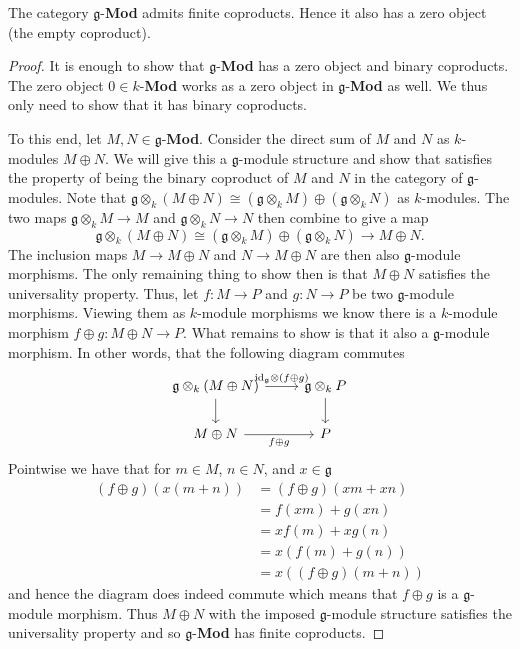 \begin{lemma}
  \label{lem:fincoprod}
  The category $ \mathfrak{g} $-\textbf{Mod} admits finite coproducts. Hence it also has a zero object (the empty coproduct).
\end{lemma}
\begin{proof}
  It is enough to show that $ \mathfrak{g} $-\textbf{Mod} has a zero object and binary coproducts. The zero object $ 0 \in k $-\textbf{Mod} works as a zero object in $ \mathfrak{g} $-\textbf{Mod} as well. We thus only need to show that it has binary coproducts.

  To this end, let $ M,N \in \mathfrak{g} $-\textbf{Mod}. Consider the direct sum of $ M $ and $ N $ as $ k $-modules $ M \oplus N $. We will give this a $ \mathfrak{g} $-module structure and show that satisfies the property of being the binary coproduct of $ M $ and $ N $ in the category of $ \mathfrak{g} $-modules. Note that $ \mathfrak{g} \otimes_k (M \oplus N) \cong (\mathfrak{g} \otimes_k M) \oplus (\mathfrak{g} \otimes_k N) $ as $ k $-modules. The two maps $ \mathfrak{g} \otimes_k M \to M $ and $ \mathfrak{g} \otimes_k N \to N $ then combine to give a map
  \begin{equation}
    \mathfrak{g} \otimes_k (M \oplus N) \cong (\mathfrak{g} \otimes_k M) \oplus (\mathfrak{g} \otimes_k N)  \to M \oplus N.
    \label{eq:bincop}
  \end{equation}
  The inclusion maps $ M \to M \oplus N $ and $ N \to M \oplus N $ are then also $ \mathfrak{g} $-module morphisms. The only remaining thing to show then is that $ M \oplus N $ satisfies the universality property. Thus, let $ f: M \to P $ and $ g: N \to P $ be two $ \mathfrak{g} $-module morphisms. Viewing them as $ k $-module morphisms we know there is a $ k $-module morphism $ f \oplus g: M \oplus N \to P $. What remains to show is that it also a $ \mathfrak{g} $-module morphism. In other words, that the following diagram commutes
  \[\begin{tikzcd}
	  {\mathfrak{g} \otimes_k (M \oplus N)} & {\mathfrak{g} \otimes_k P} \\
	  {M\oplus N} & P
	  \arrow[from=1-1, to=2-1]
	  \arrow["{f\oplus g}"', from=2-1, to=2-2]
	  \arrow[from=1-2, to=2-2]
	  \arrow["{\text{id}_\mathfrak{g} \otimes (f \oplus g)}", from=1-1, to=1-2]
  \end{tikzcd}\]
  Pointwise we have that for $ m \in M $, $ n \in N $, and $ x \in \mathfrak{g} $
  \begin{align*}
    (f \oplus g) (x(m+n)) &= (f \oplus g)(xm + xn) \\
                          &= f(xm) + g(xn) \\
                          &= xf(m) + xg(n) \\
                          &= x(f(m) + g(n)) \\
                          &= x((f \oplus g)(m + n))
  \end{align*}
  and hence the diagram does indeed commute which means that $ f \oplus g $ is a $ \mathfrak{g} $-module morphism. Thus $ M \oplus N $ with the imposed $ \mathfrak{g} $-module structure satisfies the universality property and so $ \mathfrak{g} $-\textbf{Mod} has finite coproducts.
\end{proof}

